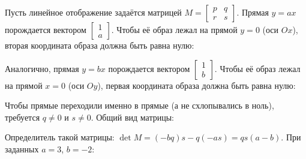 \documentclass[a4paper,14pt]{extarticle}
\begin{document}
Пусть линейное отображение задаётся матрицей
\(M = \begin{bmatrix} p & q \\ r & s \end{bmatrix}\). Прямая \(y = ax\)
порождается вектором \(\begin{bmatrix} 1 \\ a \end{bmatrix}\). Чтобы её
образ лежал на прямой \(y = 0\) (оси \(Ox\)), вторая координата образа
должна быть равна нулю:
\begin{center}\end{center}

Аналогично, прямая \(y = bx\) порождается вектором
\(\begin{bmatrix} 1 \\ b \end{bmatrix}\). Чтобы её образ лежал на прямой
\(x = 0\) (оси \(Oy\)), первая координата образа должна быть равна нулю:
\begin{center}\end{center}

Чтобы прямые переходили именно в прямые (а не схлопывались в ноль),
требуется \(q \neq 0\) и \(s \neq 0\). Общий вид матрицы:
\begin{center}\end{center}
Определитель такой матрицы: \(\det M = (-bq)s - q(-as) = qs(a - b)\).
При заданных \(a = 3\), \(b = -2\):
\begin{center}\end{center}
\end{document}
